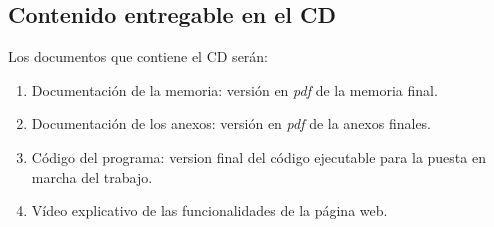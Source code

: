 \subsection{Contenido entregable en el CD}

Los documentos que contiene el CD serán:

\begin{enumerate}
\item Documentación de la memoria: versión en \textit{pdf} de la memoria final.
\item Documentación de los anexos: versión en \textit{pdf} de la anexos finales.
\item Código del programa: version final del código ejecutable para la puesta en marcha del trabajo.
\item Vídeo explicativo de las funcionalidades de la página web.
\end{enumerate}

